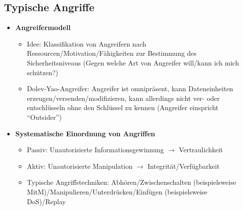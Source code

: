 \subsection{Typische Angriffe}
\begin{itemize}
	\item \textbf{Angreifermodell}
	\begin{itemize}
		\item Idee: Klassifikation von Angreifern nach Ressourcen/Motivation/Fähigkeiten zur Bestimmung des Sicherheitsniveaus (Gegen welche Art von Angreifer will/kann ich mich schützen?)
		\item Dolev-Yao-Angreifer: Angreifer ist omnipräsent, kann Dateneinheiten erzeugen/versenden/modifizieren, kann allerdings nicht ver- oder entschlüsseln ohne den Schlüssel zu kennen (Angreifer einspricht "`Outsider"')
	\end{itemize}
	\item \textbf{Systematische Einordnung von Angriffen}
	\begin{itemize}
		\item Passiv: Unautorisierte Informationsgewinnung \(\rightarrow\) Vertraulichkeit
		\item Aktiv: Unautorisierte Manipulation \(\rightarrow\) Integrität/Verfügbarkeit
		\item Typische Angriffstechniken: Abhören/Zwischenschalten (beispielsweise MitM)/Manipulieren/Unterdrücken/Einfügen (beispielsweise DoS)/Replay
	\end{itemize}
\end{itemize}



